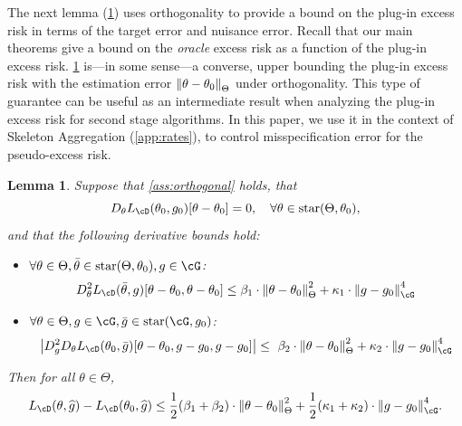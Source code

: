 \documentclass[11pt]{article} %
\newcommand{\pref}[1]{\cref{#1}}
\theoremstyle{theorem}  %
\newtheorem{lemma}{Lemma}
\theoremstyle{plain}
\DeclarePairedDelimiter{\abs}{\lvert}{\rvert} %
\DeclarePairedDelimiter{\nrm}{\|}{\|}
\newcommand{\wh}[1]{\widehat{#1}}
\newcommand{\poprisk}{L_{\cD}}
\newcommand{\starhull}{\mathrm{star}}
\newcommand{\estone}{\wh{g}}
\newcommand{\nuisance}{\cG}
\newcommand{\target}{\Theta}
\newcommand{\gtone}{g_0}
\newcommand{\gttwo}{\theta_0}
\begin{document}
The next lemma (\pref{lem:pseudo_risk}) uses orthogonality to
  provide a bound on the plug-in excess risk in terms of the target
  error and nuisance error. Recall that our main theorems give a bound
  on the \emph{oracle} excess risk as a function of the plug-in excess
  risk. \pref{lem:pseudo_risk} is---in some sense---a converse, upper
  bounding the plug-in excess risk with the estimation error
  $\nrm*{\theta-\gttwo}_{\target}$ under orthogonality. This type of
  guarantee can be useful as an intermediate result when analyzing the
  plug-in excess risk for second stage algorithms. In this paper, we
  use it in the context of Skeleton Aggregation (\pref{app:rates}), to control misspecification error for the pseudo-excess risk.

%

\begin{lemma}
  \label{lem:pseudo_risk}Suppose that \pref{ass:orthogonal} holds, that
  \[
    D_{\theta}\poprisk(\gttwo,\gtone)[\theta-\gttwo]= 0, \quad{}\forall{}\theta\in\starhull(\target,\gttwo),
  \]
  and that the following derivative bounds hold:
   \begin{itemize}
    \item $\forall{}\theta\in\target,\bar{\theta}\in\starhull(\target,\gttwo),g\in\nuisance$:
    \begin{align*}
      D^{2}_{\theta}\poprisk(\bar{\theta},g)[\theta-\gttwo,\theta-\gttwo] \leq{}\beta_1\cdot \nrm*{\theta-\gttwo}_{\target}^{2}
        + \kappa_1\cdot \nrm*{g-\gtone}_{\nuisance}^{4}
    \end{align*}
    \item $\forall{}\theta\in\target,g\in\nuisance,\bar{g}\in\starhull(\cG,\gtone)$:
    \begin{align*}
    \abs*{D^{2}_{g}D_{\theta}\poprisk(\gttwo,\bar{g})[\theta-\gttwo,g-\gtone,g-\gtone]} 
      \leq{}~ \beta_2\cdot \nrm*{\theta-\gttwo}_{\target}^2 +\kappa_2\cdot\nrm*{g-\gtone}_{\nuisance}^4
  \end{align*}
  \end{itemize}
  Then for all $\theta\in\target$,
  \begin{equation}
    \label{eq:pseudo_risk}
    \poprisk(\theta,\estone) - \poprisk(\gttwo,\estone)
    \leq{} \frac{1}{2}(\beta_1+\beta_2)\cdot \nrm*{\theta-\gttwo}_{\target}^{2}
      + \frac{1}{2}(\kappa_1+\kappa_2)\cdot \nrm*{g-\gtone}_{\nuisance}^{4}.
  \end{equation}
\end{lemma}
\end{document}
